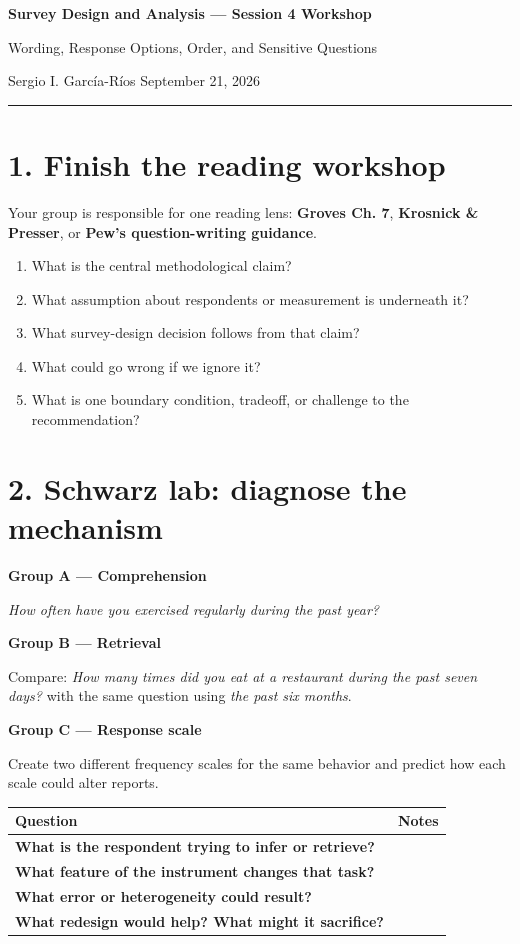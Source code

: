 \documentclass[11pt]{article}
\newcommand{\ruleline}{\rule{\textwidth}{0.4pt}}
\newcommand{\blank}[1]{\vspace{#1}}
\begin{document}
{\Large\bfseries Survey Design and Analysis --- Session 4 Workshop}\par
{\large Wording, Response Options, Order, and Sensitive Questions}\par
\smallskip
Sergio I. Garc\'ia-R\'ios \hfill September 21, 2026

\ruleline

\section*{1. Finish the reading workshop}

Your group is responsible for one reading lens: \textbf{Groves Ch. 7}, \textbf{Krosnick \& Presser}, or \textbf{Pew's question-writing guidance}.

\begin{enumerate}[leftmargin=*]
\item What is the central methodological claim?
\blank{0.45in}
\item What assumption about respondents or measurement is underneath it?
\blank{0.45in}
\item What survey-design decision follows from that claim?
\blank{0.45in}
\item What could go wrong if we ignore it?
\blank{0.45in}
\item What is one boundary condition, tradeoff, or challenge to the recommendation?
\blank{0.45in}
\end{enumerate}

\newpage

\section*{2. Schwarz lab: diagnose the mechanism}



\textbf{Group A --- Comprehension}

\emph{How often have you exercised regularly during the past year?}

\textbf{Group B --- Retrieval}

Compare: \emph{How many times did you eat at a restaurant during the past seven days?} with the same question using \emph{the past six months}.

\textbf{Group C --- Response scale}

Create two different frequency scales for the same behavior and predict how each scale could alter reports.

\medskip
\begin{tabularx}{\textwidth}{>{\bfseries}p{}X}
\toprule
Question & Notes \\
\midrule
What is the respondent trying to infer or retrieve? & \\[0.7in]
What feature of the instrument changes that task? & \\[0.7in]
What error or heterogeneity could result? & \\[0.7in]
What redesign would help? What might it sacrifice? & \\[0.7in]
\bottomrule
\end{tabularx}
\end{document}
